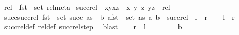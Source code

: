 \begin{isabellebody}
\isanewline
\isanewline
{}\isamarkupfalse%
\ {\isachardoublequoteopen}rel\ {\isasymequiv}\ fst\ {\isacharbackquote}{\kern0pt}\ set\ rel{\isacharunderscore}{\kern0pt}meta{\isachardoublequoteclose}\isanewline
\isanewline
{}\isamarkupfalse%
\ {\isachardoublequoteopen}succ{\isacharunderscore}{\kern0pt}rel\ {\isasymequiv}\ {\isacharbraceleft}{\kern0pt}{\isacharparenleft}{\kern0pt}{\isacharparenleft}{\kern0pt}x{\isacharcomma}{\kern0pt}y{\isacharparenright}{\kern0pt}{\isacharcomma}{\kern0pt}{\isacharparenleft}{\kern0pt}x{\isacharcomma}{\kern0pt}z{\isacharparenright}{\kern0pt}{\isacharparenright}{\kern0pt}\ {\isacharbar}{\kern0pt}\ x\ y\ z{\isachardot}{\kern0pt}\ {\isacharparenleft}{\kern0pt}y{\isacharcomma}{\kern0pt}z{\isacharparenright}{\kern0pt}\ {\isasymin}\ rel{\isacharbraceright}{\kern0pt}{\isachardoublequoteclose}\isanewline
\isanewline
\isanewline
{}\isamarkupfalse%
\ succ{\isacharunderscore}{\kern0pt}succ{\isacharunderscore}{\kern0pt}rel{\isacharcolon}{\kern0pt}\ {\isachardoublequoteopen}fst\ {\isacharbackquote}{\kern0pt}\ set\ {\isacharparenleft}{\kern0pt}succ\ as{\isacharparenright}{\kern0pt}\ {\isacharequal}{\kern0pt}\ {\isacharbraceleft}{\kern0pt}b{\isachardot}{\kern0pt}\ {\isasymexists}a{\isasymin}fst\ {\isacharbackquote}{\kern0pt}\ set\ as{\isachardot}{\kern0pt}\ {\isacharparenleft}{\kern0pt}a{\isacharcomma}{\kern0pt}\ b{\isacharparenright}{\kern0pt}\ {\isasymin}\ succ{\isacharunderscore}{\kern0pt}rel{\isacharbraceright}{\kern0pt}{\isachardoublequoteclose}\ {\isacharparenleft}{\kern0pt}\ {\isachardoublequoteopen}{\isacharquery}{\kern0pt}l\ {\isacharequal}{\kern0pt}\ {\isacharquery}{\kern0pt}r{\isachardoublequoteclose}{\isacharparenright}{\kern0pt}\isanewline
%
\isadelimproof
%
\endisadelimproof
%
\isatagproof
{}\isamarkupfalse%
\isanewline
\ \ \isamarkupfalse%
\ {\isachardoublequoteopen}{\isacharquery}{\kern0pt}l\ {\isasymsubseteq}\ {\isacharquery}{\kern0pt}r{\isachardoublequoteclose}\ \isamarkupfalse%
\ succ{\isacharunderscore}{\kern0pt}rel{\isacharunderscore}{\kern0pt}def\ rel{\isacharunderscore}{\kern0pt}def\ succ{\isacharunderscore}{\kern0pt}rel{\isacharunderscore}{\kern0pt}step\ \isamarkupfalse%
\ blast\isanewline
\ \ \isamarkupfalse%
\ {\isachardoublequoteopen}{\isacharquery}{\kern0pt}r\ {\isasymsubseteq}\ {\isacharquery}{\kern0pt}l{\isachardoublequoteclose}\isanewline
\ \ \isamarkupfalse%
\isanewline
\ \ \ \ \isamarkupfalse%
\ b\isanewline

\end{isabellebody}
